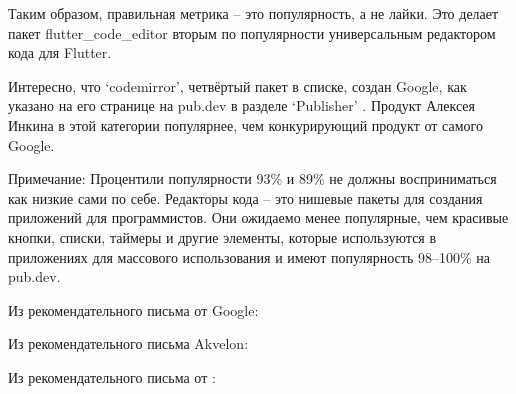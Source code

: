 Таким образом, правильная метрика -- это популярность, а не лайки.
Это делает пакет flutter\_code\_editor вторым по популярности универсальным редактором кода для Flutter.

Интересно, что `codemirror', четвёртый пакет в списке, создан Google,
как указано на его странице на pub.dev в разделе `Publisher' .
Продукт Алексея Инкина в этой категории популярнее, чем конкурирующий продукт от самого Google.

Примечание: Процентили популярности 93\% и 89\% не должны восприниматься как низкие сами по себе.
Редакторы кода -- это нишевые пакеты для создания приложений для программистов.
Они ожидаемо менее популярные, чем красивые кнопки, списки, таймеры и другие элементы,
которые используются в приложениях для массового использования и имеют популярность 98--100\% на pub.dev.



Из рекомендательного письма от Google:


Из рекомендательного письма Akvelon:


Из рекомендательного письма от \MrEditorT:

